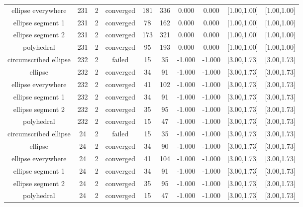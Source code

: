\begin{tiny}
\begin{center}
\begin{longtable}{ c c c c c c c c c c }
    ellipse everywhere    &  231  &  2  & converged  &  181  &  336  &   0.000    &   0.000    & [1.00,1.00] & [1.00,1.00] \\
    ellipse segment 1     &  231  &  2  & converged  &   78  &  162  &   0.000    &   0.000    & [1.00,1.00] & [1.00,1.00] \\
    ellipse segment 2     &  231  &  2  & converged  &  173  &  321  &   0.000    &   0.000    & [1.00,1.00] & [1.00,1.00] \\
        polyhedral        &  231  &  2  & converged  &   95  &  193  &   0.000    &   0.000    & [1.00,1.00] & [1.00,1.00] \\
  circumscribed ellipse   &  232  &  2  &   failed   &   15  &   35  &   -1.000   &   -1.000   & [3.00,1.73] & [3.00,1.73] \\
         ellipse          &  232  &  2  & converged  &   34  &   91  &   -1.000   &   -1.000   & [3.00,1.73] & [3.00,1.73] \\
    ellipse everywhere    &  232  &  2  & converged  &   41  &  102  &   -1.000   &   -1.000   & [3.00,1.73] & [3.00,1.73] \\
    ellipse segment 1     &  232  &  2  & converged  &   34  &   91  &   -1.000   &   -1.000   & [3.00,1.73] & [3.00,1.73] \\
    ellipse segment 2     &  232  &  2  & converged  &   35  &   95  &   -1.000   &   -1.000   & [3.00,1.73] & [3.00,1.73] \\
        polyhedral        &  232  &  2  & converged  &   15  &   47  &   -1.000   &   -1.000   & [3.00,1.73] & [3.00,1.73] \\
  circumscribed ellipse   &   24  &  2  &   failed   &   15  &   35  &   -1.000   &   -1.000   & [3.00,1.73] & [3.00,1.73] \\
         ellipse          &   24  &  2  & converged  &   34  &   90  &   -1.000   &   -1.000   & [3.00,1.73] & [3.00,1.73] \\
    ellipse everywhere    &   24  &  2  & converged  &   41  &  104  &   -1.000   &   -1.000   & [3.00,1.73] & [3.00,1.73] \\
    ellipse segment 1     &   24  &  2  & converged  &   34  &   91  &   -1.000   &   -1.000   & [3.00,1.73] & [3.00,1.73] \\
    ellipse segment 2     &   24  &  2  & converged  &   35  &   95  &   -1.000   &   -1.000   & [3.00,1.73] & [3.00,1.73] \\
        polyhedral        &   24  &  2  & converged  &   15  &   47  &   -1.000   &   -1.000   & [3.00,1.73] & [3.00,1.73] \\

\end{longtable}
\end{center}
\end{tiny}
